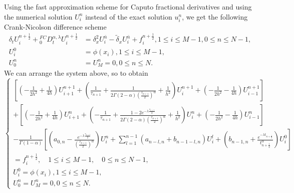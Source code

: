 \documentclass[10pt, reqno]{amsart}
\theoremstyle{remark}
\theoremstyle{definition}
\numberwithin{table}{section}
\begin{document}
Using the fast approximation scheme for Caputo fractional derivatives and using the numerical solution $U_i^n$ instead of the exact solution $u_i^n$,  we get the following Crank-Nicolson difference scheme
\begin{align}
            {\delta_t}U_i^{n+\frac{1}{2}}+{ }_0^{FC}D_t^{\alpha,  \lambda} U_i^{n+\frac{1}{2}}&=\delta_x^2U_i^{\bar{n}}-\tilde{\delta}_x U_i^{\bar{n}}+f_i^{n+\frac{1}{2}}, 1\leq i \leq M-1, 0\leq n \leq N-1, \label{scheme1}\\
        U_i^0&=\phi(x_i), 1\leq i\leq M-1, \label{scheme2}\\
        U_0^n&=U_M^n=0, 0\leq n \leq N\label{scheme3}. 
\end{align}
We can arrange the system above,  so to obtain
\begin{equation}
\left\{\begin{array}{l}
{\left[\left(-\frac{1}{2 h^2}+\frac{1}{4h}\right) U_{i+1}^{n+1}+\left(\frac{1}{\tau_{n+1}}+\frac{1}{2\Gamma(2-\alpha)(\frac{\tau_{n+1}}{2})^\alpha}+\frac{1}{h^2}\right) U_i^{n+1}+\left(-\frac{1}{2 h^2}-\frac{1}{4h}\right) U_{i-1}^{n+1}\right]} \\
+\left[\left(-\frac{1}{2 h^2}+\frac{1}{4h}\right) U_{i+1}^{n}+\left(-\frac{1}{\tau_{n+1}}+\frac{1-2e^{-\lambda \frac{\tau_{n+1}}{2}}}{2\Gamma(2-\alpha)(\frac{\tau_{n+1}}{2})^\alpha}+\frac{1}{h^2}\right) U_i^{n}+\left(-\frac{1}{2 h^2}-\frac{1}{4h}\right) U_{i-1}^{n}\right] \\
-\frac{1}{\Gamma(1-\alpha)}\left[(a_{0, n}-\frac{e^{-\lambda \frac{\tau_{n+1}}{2}}}{(\frac{\tau_{n+1}}{2})^\alpha}) U_i^n+\sum\limits_{l=1}^{n-1} \left(a_{n-l, n}+b_{n-1-l, n}\right) U_i^l+(b_{n-1, n}+\frac{e^{-\lambda t_{n+\frac{1}{2}}}}{t_{n+\frac{1}{2}}^\alpha}) U_i^0\right] \\
=f_i^{n+\frac{1}{2}},  \quad 1 \leq i \leq M-1,  \quad 0 \leq n \leq N-1,  \\
U_i^0=\phi\left(x_i\right),  1 \leq i \leq M-1,  \\
U_0^n=U_M^n=0, 0 \leq n \leq N . 
\end{array}\right. 
\end{equation}
\end{document}
